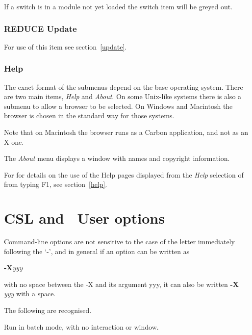 If a switch is in a module not yet loaded the switch item will be
greyed out.

\subsubsection{REDUCE Update}

For use of this item see section~\ref{update}.

\subsubsection{Help}

The exact format of the submenus depend on the base operating system.
There are two main items, {\em Help} and {\em About}.  On some
Unix-like systems there is also a submenu to allow a browser to be
selected.  On Windows and Macintosh the browser is chosen in the
standard way for those systems.

Note that on Macintosh the browser runs as a Carbon application, and
not as an X one.

The {\em About} menu displays a window with names and copyright
information.

For for details on the use of the Help pages displayed from the {\em
  Help} selection of from typing F1, see section~\ref{help}.

\section{CSL and \REDUCE\ User options}
\label{Options}

Command-line options are not sensitive to the case of the letter
immediately following the `-', and in general if an option can be
written as

\hspace*{1cm} {\large {\bf -X}{\em yyy}} 

\noindent with no space between the -X and its argument yyy, it can
also be written {\large {\bf -X }{\em yyy}} with a space.

The following are recognised.

\vspace{2mm}
\vspace{1mm}

\hspace*{.25in}\parbox{4.5in}{
Run in batch mode, with no interaction or window.
}

\vspace{2mm}
\vspace{1mm}

